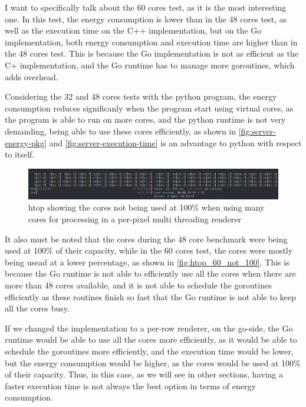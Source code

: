 I want to specifically talk about the 60 cores test, as it is the most interesting one. In this test, the energy consumption is lower than in the 48 cores test, as well as the execution time on the C++ implementation, but on the Go implementation, both energy consumption and execution time are higher than in the 48 cores test. This is because the Go implementation is not as efficient as the C\++ implementation, and the Go runtime has to manage more goroutines, which adds overhead. 

Considering the 32 and 48 cores tests with the python program, the energy consumption reduces significanly when the program start using virtual cores, as the program is able to run on more cores, and the python runtime is not very demanding, being able to use these cores efficiently, as shown in \autoref{fig:server-energy-pkg} and \autoref{fig:server-execution-time} is an advantage to python with respect to itself.





\begin{figure}
    \centering
    \includegraphics[width=1\linewidth]{img/htop_not_running_100_60_cores.png}
    \caption{\gls{htop} showing the cores not being used at 100\% when using many cores for processing in a per-pixel multi threading renderer }
    \label{fig:htop_60_not_100}
\end{figure}

It also must be noted that the cores during the 48 core benchmark were being used at 100\% of their capacity, while in the 60 cores test, the cores were mostly being usead at a lower percentage, as shown in \autoref{fig:htop_60_not_100}. This is because the Go runtime is not able to efficiently use all the cores when there are more than 48 cores available, and it is not able to schedule the goroutines efficiently as these routines finish so fast that the Go runtime is not able to keep all the cores busy.

If we changed the implementation to a per-row renderer, on the go-side, the Go runtime would be able to use all the cores more efficiently, as it would be able to schedule the goroutines more efficiently, and the execution time would be lower, but the energy consumption would be higher, as the cores would be used at 100\% of their capacity. Thus, in this case, as we will see in other sections, having a faster execution time is not always the best option in terms of energy consumption.



